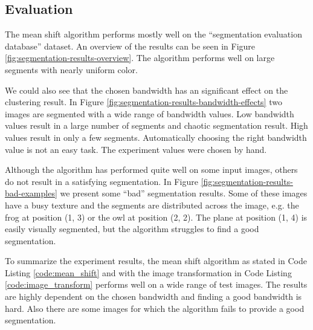 \documentclass{article}
\begin{document}
\subsection{Evaluation}

The mean shift algorithm performs mostly well on the ``segmentation evaluation database'' dataset. An overview of the results can be seen in Figure \ref{fig:segmentation-results-overview}. The algorithm performs well on large segments with nearly uniform color.

We could also see that the chosen bandwidth has an significant effect on the clustering result. In Figure \ref{fig:segmentation-results-bandwidth-effects} two images are segmented with a wide range of bandwidth values. Low bandwidth values result in a large number of segments and chaotic segmentation result. High values result in only a few segments. Automatically choosing the right bandwidth value is not an easy task. The experiment values were chosen by hand.

Although the algorithm has performed quite well on some input images, others do not result in a satisfying segmentation. In Figure \ref{fig:segmentation-results-bad-examples} we present some ``bad'' segmentation results. Some of these images have a busy texture and the segments are distributed across the image, e.g. the frog at position (1, 3) or the owl at position (2, 2). The plane at position (1, 4) is easily visually segmented, but the algorithm struggles to find a good segmentation.

To summarize the experiment results, the mean shift algorithm as stated in Code Listing \ref{code:mean_shift} and with the image transformation in Code Listing \ref{code:image_transform} performs well on a wide range of test images. The results are highly dependent on the chosen bandwidth and finding a good bandwidth is hard. Also there are some images for which the algorithm fails to provide a good segmentation.
\end{document}
